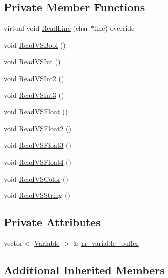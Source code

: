 \subsection*{Private Member Functions}
\begin{DoxyCompactItemize}
\item 
virtual void \hyperlink{classmage_1_1_v_s_reader_a3a3ba09b410e2144ed082db5f1da3113}{Read\+Line} (char $\ast$line) override
\item 
void \hyperlink{classmage_1_1_v_s_reader_a579233b81762c064739a29ba1c140898}{Read\+V\+S\+Bool} ()
\item 
void \hyperlink{classmage_1_1_v_s_reader_abbb6176a73ebddd88fc3ed58c89aa01a}{Read\+V\+S\+Int} ()
\item 
void \hyperlink{classmage_1_1_v_s_reader_a4a3b90b47cb5e262a72df719674b9d93}{Read\+V\+S\+Int2} ()
\item 
void \hyperlink{classmage_1_1_v_s_reader_a6fa8fa2cbb66a9a1872bb84a0612a32d}{Read\+V\+S\+Int3} ()
\item 
void \hyperlink{classmage_1_1_v_s_reader_a64c525d3d87ed248424e4eba359d9ecf}{Read\+V\+S\+Float} ()
\item 
void \hyperlink{classmage_1_1_v_s_reader_a18c7821c219354d84f0071a5bfa8651c}{Read\+V\+S\+Float2} ()
\item 
void \hyperlink{classmage_1_1_v_s_reader_a63d8c0cb3108d8aa0f582a59b44db6ac}{Read\+V\+S\+Float3} ()
\item 
void \hyperlink{classmage_1_1_v_s_reader_aa1230cf0d6305f98172aabeacbfef8e0}{Read\+V\+S\+Float4} ()
\item 
void \hyperlink{classmage_1_1_v_s_reader_a42bdfc1fcc6f385e0f88820491d53e04}{Read\+V\+S\+Color} ()
\item 
void \hyperlink{classmage_1_1_v_s_reader_a8d00057f90b2a2ed2e84e47530f91227}{Read\+V\+S\+String} ()
\end{DoxyCompactItemize}
\subsection*{Private Attributes}
\begin{DoxyCompactItemize}
\item 
vector$<$ \hyperlink{structmage_1_1_variable}{Variable} $>$ \& \hyperlink{classmage_1_1_v_s_reader_a535a576912adc3dadb1523280b5e5fc3}{m\+\_\+variable\+\_\+buffer}
\end{DoxyCompactItemize}
\subsection*{Additional Inherited Members}


